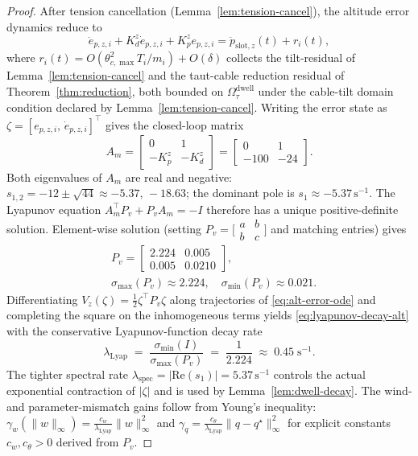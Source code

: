 \begin{proof}
After tension cancellation (Lemma~\ref{lem:tension-cancel}), the altitude error dynamics reduce to
\begin{equation}
  \ddot{e}_{p,z,i} + K_d^z \dot{e}_{p,z,i} + K_p^z e_{p,z,i} = \ddot{p}_{\mathrm{slot},z}(t) + r_i(t),
  \label{eq:alt-error-ode}
\end{equation}
where $r_i(t) = O(\theta_{c,\max}^2 T_i / m_i) + O(\delta)$ collects the tilt-residual of Lemma~\ref{lem:tension-cancel} and the taut-cable reduction residual of Theorem~\ref{thm:reduction}, both bounded on $\Omega_\tau^{\mathrm{dwell}}$ under the cable-tilt domain condition declared by Lemma~\ref{lem:tension-cancel}. Writing the error state as $\zeta = [e_{p,z,i},\, \dot e_{p,z,i}]^\top$ gives the closed-loop matrix
\begin{equation}
  A_m = \begin{bmatrix} 0 & 1 \\ -K_p^z & -K_d^z \end{bmatrix}
      = \begin{bmatrix} 0 & 1 \\ -100 & -24 \end{bmatrix}.
\end{equation}
Both eigenvalues of $A_m$ are real and negative: $s_{1,2} = -12 \pm \sqrt{44} \approx -5.37,\, -18.63$; the dominant pole is $s_1 \approx -5.37\,\mathrm{s}^{-1}$. The Lyapunov equation $A_m^\top P_v + P_v A_m = -I$ therefore has a unique positive-definite solution. Element-wise solution (setting $P_v = \bigl[\begin{smallmatrix} a & b \\ b & c \end{smallmatrix}\bigr]$ and matching entries) gives
\begin{align}
\label{eq:Pv-numeric}
  &P_v = \begin{bmatrix}
    2.224 & 0.005 \\ 0.005 & 0.0210
  \end{bmatrix},\\
  &\sigma_{\max}(P_v) \approx 2.224,
  \quad
  \sigma_{\min}(P_v) \approx 0.021.\nonumber
\end{align}
Differentiating $V_z(\zeta) = \tfrac{1}{2}\zeta^\top P_v \zeta$ along trajectories of \eqref{eq:alt-error-ode} and completing the square on the inhomogeneous terms yields \eqref{eq:lyapunov-decay-alt} with the conservative Lyapunov-function decay rate
\begin{equation}
  \lambda_{\mathrm{Lyap}}
    \;=\; \frac{\sigma_{\min}(I)}{\sigma_{\max}(P_v)}
    \;=\; \frac{1}{2.224}
    \;\approx\; 0.45\;\mathrm{s}^{-1}.
\end{equation}
The tighter spectral rate $\lambda_{\mathrm{spec}} = |\mathrm{Re}(s_1)| = 5.37\,\mathrm{s}^{-1}$ controls the actual exponential contraction of $|\zeta|$ and is used by Lemma~\ref{lem:dwell-decay}. The wind- and parameter-mismatch gains follow from Young's inequality: $\gamma_w(\|w\|_\infty) = \tfrac{c_w}{\lambda_{\mathrm{Lyap}}}\|w\|_\infty^2$ and $\gamma_q = \tfrac{c_\theta}{\lambda_{\mathrm{Lyap}}} \|q - q^\star\|_\infty^2$ for explicit constants $c_w, c_\theta > 0$ derived from $P_v$.
\end{proof}



